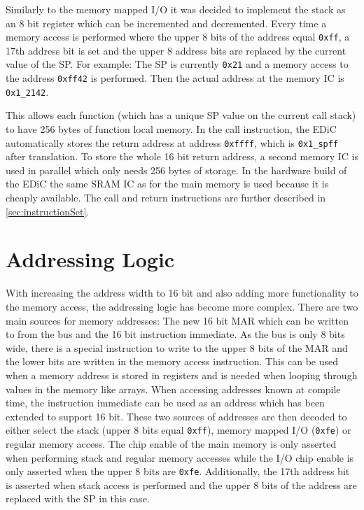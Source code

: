 Similarly to the memory mapped I/O it was decided to implement the stack as an 8 bit register which can be incremented and decremented.
Every time a memory access is performed where the upper 8 bits of the address equal \texttt{0xff}, a 17th address bit is set and the upper 8 address bits are replaced by the current value of the \gls{SP}.
For example: The \gls{SP}  is currently \texttt{0x21} and a memory access to the address \texttt{0xff42} is performed.
Then the actual address at the memory \gls{IC} is \texttt{0x1\_2142}.

This allows each function (which has a unique \gls{SP} value on the current call stack) to have 256 bytes of function local memory.
In the call instruction, the \gls{EDiC} automatically stores the return address at address \texttt{0xffff}, which is \texttt{0x1\_spff} after translation.
To store the whole 16 bit return address, a second memory \gls{IC} is used in parallel which only needs 256 bytes of storage.
In the hardware build of the \gls{EDiC} the same \gls{SRAM} \gls{IC} as for the main memory is used because it is cheaply available.
The call and return instructions are further described in \cref{sec:instructionSet}.
\section{Addressing Logic}\label{sec:addrLogic}
With increasing the address width to 16 bit and also adding more functionality to the memory access, the addressing logic has become more complex.
There are two main sources for memory addresses: The new 16 bit \gls{MAR} which can be written to from the bus and the 16 bit instruction immediate.
As the bus is only 8 bits wide, there is a special instruction to write to the upper 8 bits of the \gls{MAR} and the lower bits are written in the memory access instruction.
This can be used when a memory address is stored in registers and is needed when looping through values in the memory like arrays.
When accessing addresses known at compile time, the instruction immediate can be used as an address which has been extended to support 16 bit.
These two sources of addresses are then decoded to either select the stack (upper 8 bits equal \texttt{0xff}), memory mapped I/O (\texttt{0xfe}) or regular memory access.
The chip enable of the main memory is only asserted when performing stack and regular memory accesses while the I/O chip enable is only asserted when the upper 8 bits are \texttt{0xfe}.
Additionally, the 17th address bit is asserted when stack access is performed and the upper 8 bits of the address are replaced with the \gls{SP} in this case.

